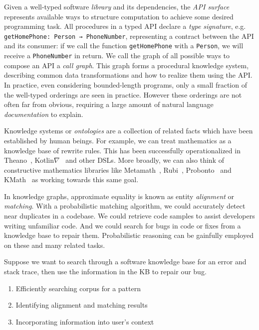 \documentclass[11pt]{article}
\begin{document}
    Given a well-typed software \textit{library} and its dependencies, the \textit{API surface} represents available ways to structure computation to achieve some desired programming task. All procedures in a typed API declare a \textit{type signature}, e.g. \texttt{getHomePhone: Person → PhoneNumber}, representing a contract between the API and its consumer: if we call the function \texttt{getHomePhone} with a \texttt{Person}, we will receive a \texttt{PhoneNumber} in return. We call the graph of all possible ways to compose an API a \textit{call graph}. This graph forms a procedural knowledge system, describing common data transformations and how to realize them using the API. In practice, even considering bounded-length programs, only a small fraction of the well-typed orderings are seen in practice. However these orderings are not often far from obvious, requiring a large amount of natural language \textit{documentation} to explain.

    Knowledge systems or \textit{ontologies} are a collection of related facts which have been established by human beings. For example, we can treat mathematics as a knowledge base of rewrite rules. This has been successfully operationalized in Theano~\citep{bergstra2010theano}, Kotlin$\nabla$~\citep{considine2019kotlingrad} and other DSLs. More broadly, we can also think of constructive mathematics libraries like Metamath~\citep{megill2006metamath}, Rubi~\citep{rich2009knowledge}, Probonto~\citep{swat2016probonto} and KMath~\citep{nozik2019kotlin} as working towards this same goal.

    In knowledge graphs, approximate equality is known as entity \textit{alignment} or \textit{matching}. With a probabilistic matching algorithm, we could accurately detect near duplicates in a codebase. We could retrieve code samples to assist developers writing unfamiliar code. And we could search for bugs in code or fixes from a knowledge base to repair them. Probabilistic reasoning can be gainfully employed on these and many related tasks.

    Suppose we want to search through a software knowledge base for an error and stack trace, then use the information in the KB to repair our bug.

    \begin{enumerate}
        \item Efficiently searching corpus for a pattern
        \item Identifying alignment and matching results
        \item Incorporating information into user's context
    \end{enumerate}
\end{document}
